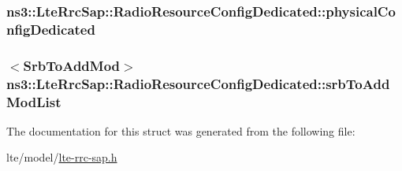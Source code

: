 \subsubsection[{\texorpdfstring{physical\+Config\+Dedicated}{physicalConfigDedicated}}]{ ns3\+::\+Lte\+Rrc\+Sap\+::\+Radio\+Resource\+Config\+Dedicated\+::physical\+Config\+Dedicated}\hypertarget{structns3_1_1LteRrcSap_1_1RadioResourceConfigDedicated_a1832a9a12892edeba8a7ddecdfab9b0d}{}\label{structns3_1_1LteRrcSap_1_1RadioResourceConfigDedicated_a1832a9a12892edeba8a7ddecdfab9b0d}
\subsubsection[{\texorpdfstring{srb\+To\+Add\+Mod\+List}{srbToAddModList}}]{$<${\bf Srb\+To\+Add\+Mod}$>$ ns3\+::\+Lte\+Rrc\+Sap\+::\+Radio\+Resource\+Config\+Dedicated\+::srb\+To\+Add\+Mod\+List}\hypertarget{structns3_1_1LteRrcSap_1_1RadioResourceConfigDedicated_ae5fcfd17974bfa04fce84b6ba46cb47b}{}\label{structns3_1_1LteRrcSap_1_1RadioResourceConfigDedicated_ae5fcfd17974bfa04fce84b6ba46cb47b}


The documentation for this struct was generated from the following file\+:\begin{DoxyCompactItemize}
\item 
lte/model/\hyperlink{lte-rrc-sap_8h}{lte-\/rrc-\/sap.\+h}\end{DoxyCompactItemize}
